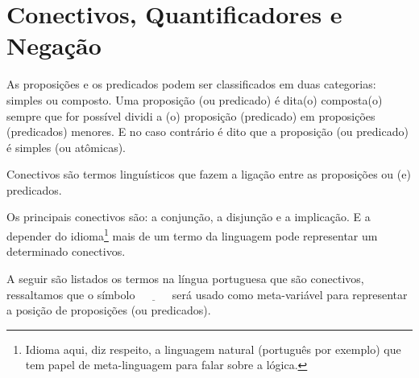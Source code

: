 \section{Conectivos, Quantificadores e Negação}\label{sec:LogicsConnectives}

As proposições e os predicados podem ser classificados em duas categorias: simples ou composto. Uma proposição (ou predicado) é dita(o) composta(o) sempre que for possível dividi a (o) proposição (predicado) em proposições (predicados) menores. E no caso contrário é dito que a proposição (ou predicado) é simples (ou atômicas).

\begin{definicao}[Conectivos]\label{def:Conectivos}
	Conectivos são termos linguísticos que fazem a ligação entre as proposições ou (e) predicados.
\end{definicao}

Os principais conectivos são: a conjunção, a disjunção e a implicação. E a depender do idioma\footnote{Idioma aqui, diz respeito, a linguagem natural (português por exemplo) que tem papel de meta-linguagem para falar sobre a lógica.} mais de um termo da linguagem pode representar um determinado conectivos. 

A seguir são listados os termos na língua portuguesa que são conectivos, ressaltamos que o símbolo $\underline{ \ \ \ \ \ \ \ \ \ \ \ \ }$ será usado como meta-variável para representar a posição de proposições (ou predicados).

